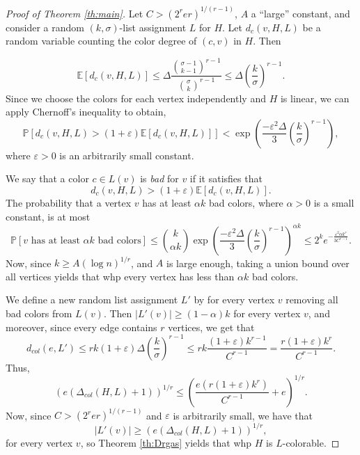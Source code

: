 \documentclass[12pt]{article}
\newcommand{\1}{\mathds{1}}
\begin{document}
\begin{proof}[Proof of Theorem \ref{th:main}]
	Let $C > (2^r er)^{1/(r-1)}$, $A$ a ``large'' constant, and consider a  random 
	$(k, \sigma)$-list assignment $L$ for $H$.
	Let $d_c(v,H,L)$ be a random variable counting the color degree of $(c,v)$ in $H$. Then

$$
\mathbb{E}[d_c(v,H,L)] \leq \Delta \frac{\binom{\sigma-1}{k-1}^{r-1}}{\binom{\sigma}{k}^{r-1}}
\leq \Delta \left(\frac{k}{\sigma}\right)^{r-1}.
$$
Since we choose the colors for each vertex independently and $H$ is linear, we can apply Chernoff's inequality to obtain,
$$
\mathbb{P}\left[d_c(v,H,L) > (1 + \varepsilon)\mathbb{E}[d_c(v,H,L)]\right] < 
\exp \left( \frac{-\varepsilon^2 \Delta}{3}\left(\frac{k}{\sigma}\right)^{r-1}\right),
$$
where $\varepsilon>0$ is an arbitrarily small constant. 

We say that a color $c \in L(v)$ is {\em bad} for $v$ if
it satisfies that $$d_c(v,H,L) > (1 + \varepsilon)\mathbb{E}[d_c(v,H,L)].$$
The probability that a vertex $v$ has at least $\alpha k$ bad colors,
where $\alpha>0$ is a small constant, is at most
$$
\mathbb{P}[v \textrm{ has at least $\alpha k$ bad colors}] \leq 
\binom{k}{\alpha k} \exp \left( \frac{-\varepsilon^2 \Delta}{3}\left(\frac{k}{\sigma}\right)^{r-1}\right)^{\alpha k}
\leq 2^k e^{-\frac{\varepsilon^2\alpha k^r}{3C^{r-1}}}.
$$
Now, since $k \geq A (\log n)^{1/r}$, and $A$ is large enough, taking a union bound over all vertices yields that whp every vertex
has less than $\alpha k$ bad colors.

We define a new random list assignment $L'$ by
for every vertex $v$ removing all bad colors from $L(v)$.
Then $|L'(v)| \geq (1-\alpha) k$ for every vertex $v$, and moreover, since every edge contains $r$ vertices, we get that
$$d_{col}(e,L') \leq rk (1+\varepsilon) \Delta \left(\frac{k}{\sigma}\right)^{r-1}
\leq
rk \frac{ (1+\varepsilon) k^{r-1}}{C^{r-1}} = \frac{ r(1+\varepsilon) k^r}{C^{r-1}}.$$
Thus,
$$\left(e (\Delta_{col}(H,L) +1) \right)^{1/r} \leq 
\left(\frac{e  (r(1+\varepsilon) k^{r})}{C^{r-1}}+e\right)^{1/r}.$$
Now,
since $C > (2^r er)^{1/(r-1)}$ and $\varepsilon$ is arbitrarily small, we have that
$$|L'(v)| \geq \left(e (\Delta_{col}(H,L) +1) \right)^{1/r},$$
for every vertex $v$,
so Theorem \ref{th:Drgas} yields that whp $H$ is $L$-colorable.
\end{proof}
	


\end{document}
